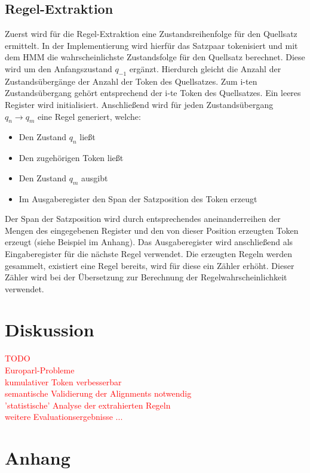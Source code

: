 \documentclass[conference]{IEEEtran}
\begin{document}
\subsection{Regel-Extraktion}
Zuerst wird für die Regel-Extraktion eine Zustandsreihenfolge für den Quellsatz ermittelt.
In der Implementierung wird hierfür das Satzpaar tokenisiert und mit dem HMM die wahrscheinlichste Zustandsfolge für den Quellsatz berechnet.
Diese wird um den Anfangszustand $q_{-1}$ ergänzt.
Hierdurch gleicht die Anzahl der Zustandsübergänge der Anzahl der Token des Quellsatzes.
Zum i-ten Zustandsübergang gehört entsprechend der i-te Token des Quellsatzes.
Ein leeres Register wird initialisiert.
Anschließend wird für jeden Zustandsübergang $q_n \rightarrow q_m$ eine Regel generiert, welche:
\begin{itemize}
    \item Den Zustand $q_n$ ließt
    \item Den zugehörigen Token ließt
    \item Den Zustand $q_m$ ausgibt
    \item Im Ausgaberegister den Span der Satzposition des Token erzeugt
\end{itemize}
Der Span der Satzposition wird durch entsprechendes aneinanderreihen der Mengen des eingegebenen Register und den von dieser Position erzeugten Token erzeugt (siehe Beispiel im Anhang).
Das Ausgaberegister wird anschließend als Eingaberegister für die nächste Regel verwendet.
Die erzeugten Regeln werden gesammelt, existiert eine Regel bereits, wird für diese ein Zähler erhöht.
Dieser Zähler wird bei der Übersetzung zur Berechnung der Regelwahrscheinlichkeit verwendet.


\section{Diskussion}
\textcolor{red}{TODO\\
Europarl-Probleme\\
kumulativer Token verbesserbar\\
semantische Validierung der Alignments notwendig\\
'statistische' Analyse der extrahierten Regeln\\
weitere Evaluationsergebnisse ...\\}





\section{Anhang}
\end{document}
